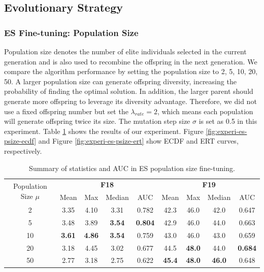 \documentclass{article}
\begin{document}
\subsection{Evolutionary Strategy}
\subsubsection{ES Fine-tuning: Population Size}

Population size denotes the number of elite individuals selected in the current generation and is also used to recombine the offspring in the next generation. We compare the algorithm performance by setting the population size to 2, 5, 10, 20, 50.  A larger population size can generate offspring diversity, increasing the probability of finding the optimal solution. In addition, the larger parent should generate more offspring to leverage its diversity advantage. Therefore, we did not use a fixed offspring number but set the $\lambda_{rate} = 2$, which means each population will generate offspring twice its size. The mutation step size $\sigma$ is set as 0.5 in this experiment. Table \ref{tab:experi-es-psize} shows the results of our experiment. Figure \ref{fig:experi-es-psize-ecdf} and Figure \ref{fig:experi-es-psize-ert} show ECDF and ERT curves, respectively.

\begin{table}[!ht]
    \centering
    \caption{Summary of statistics and AUC in ES population size fine-tuning.}
    \label{tab:experi-es-psize}
    \begin{tabular}{ccccccccc}
        \toprule
        \multirow{2}[3]{*}{Population Size $\mu$} &
        \multicolumn{4}{c}{\textbf{F18}} &
        \multicolumn{4}{c}{\textbf{F19}}\\
        \cmidrule(lr){2-5}
        \cmidrule(lr){6-9}
        & Mean & Max & Median & AUC & Mean & Max & Median & AUC\\
        \midrule
        2   & 3.35 & 4.10 & 3.31 & 0.782 & 42.3  & 46.0 & 42.0 & 0.647\\
        5   & 3.48 & 3.89 & \textbf{3.54} & \textbf{0.804} & 42.9  & 46.0 & 44.0 & 0.663\\
        10  & \textbf{3.61} & \textbf{4.86} & \textbf{3.54} & 0.759 & 43.0 & 46.0 & 43.0 & 0.659\\
        20  & 3.18 & 4.45 & 3.02 & 0.677 & 44.5  & \textbf{48.0} & 44.0 & \textbf{0.684}\\
        50  & 2.77 & 3.18 & 2.75 & 0.622 & \textbf{45.4 } & \textbf{48.0} & \textbf{46.0} & 0.648\\
        \bottomrule
    \end{tabular}
\end{table}
\end{document}
